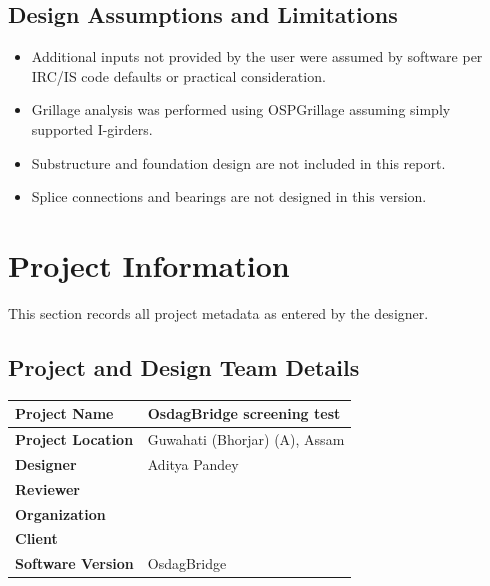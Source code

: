 \documentclass[12pt,a4paper]{report}
\numberwithin{table}{chapter}
\numberwithin{figure}{chapter}
\begin{document}
\section*{Design Assumptions and Limitations}
\label{sec:assumptions}

\begin{itemize}
\item Additional inputs not provided by the user were assumed by software per IRC/IS code defaults or practical consideration.
\item Grillage analysis was performed using OSPGrillage assuming simply supported I-girders.
\item Substructure and foundation design are not included in this report.
\item Splice connections and bearings are not designed in this version.
\end{itemize}

\titleformat{\chapter}[block]{\normalfont\Large\bfseries\centering}{\thechapter}{1em}{}
\titlespacing*{\chapter}{0pt}{-30pt}{10pt}


\chapter{Project Information}

This section records all project metadata as entered by the designer.

\section{Project and Design Team Details}
\label{sec:project-details}

\begin{tabular}{|L{5.5cm}|L{8.5cm}|}
\hline
\textbf{Project Name} & OsdagBridge screening test \\
\hline
\textbf{Project Location} & Guwahati (Bhorjar) (A), Assam \\
\hline
\textbf{Designer} & Aditya Pandey \\
\hline
\textbf{Reviewer} &  \\
\hline
\textbf{Organization} &  \\
\hline
\textbf{Client} &  \\
\hline
\textbf{Software Version} & OsdagBridge \\
\hline
\end{tabular}
\end{document}
